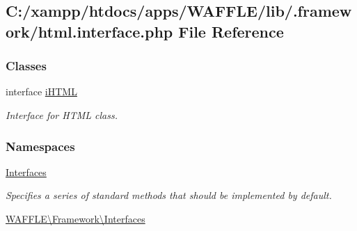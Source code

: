 \hypertarget{html_8interface_8php}{}\subsection{C\+:/xampp/htdocs/apps/\+W\+A\+F\+F\+L\+E/lib/.framework/html.interface.\+php File Reference}
\label{html_8interface_8php}
\subsubsection*{Classes}
\begin{DoxyCompactItemize}
\item 
interface \hyperlink{interface_w_a_f_f_l_e_1_1_framework_1_1_interfaces_1_1i_h_t_m_l}{i\+H\+T\+ML}
\begin{DoxyCompactList}\small\item\em Interface for H\+T\+ML class. \end{DoxyCompactList}\end{DoxyCompactItemize}
\subsubsection*{Namespaces}
\begin{DoxyCompactItemize}
\item 
 \hyperlink{namespace_interfaces}{Interfaces}
\begin{DoxyCompactList}\small\item\em Specifies a series of standard methods that should be implemented by default. \end{DoxyCompactList}\item 
 \hyperlink{namespace_w_a_f_f_l_e_1_1_framework_1_1_interfaces}{W\+A\+F\+F\+L\+E\textbackslash{}\+Framework\textbackslash{}\+Interfaces}
\end{DoxyCompactItemize}
